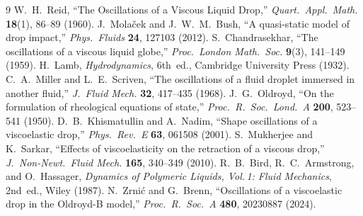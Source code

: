 \documentclass[12pt]{article}
\theoremstyle{definition}
\begin{document}
\bigskip







\begin{thebibliography}{9}
  W.~H.~Reid,
  ``The Oscillations of a Viscous Liquid Drop,''
  \emph{Quart.\ Appl.\ Math.} \textbf{18}(1), 86--89 (1960).
  J.~Mola\v{c}ek and J.~W.~M.~Bush,
  ``A quasi-static model of drop impact,''
  \emph{Phys.\ Fluids} \textbf{24}, 127103 (2012).
  S.~Chandrasekhar,
  ``The oscillations of a viscous liquid globe,''
  \emph{Proc.\ London Math.\ Soc.} \textbf{9}(3), 141--149 (1959).
  H.~Lamb,
  \emph{Hydrodynamics}, 6th~ed., Cambridge University Press (1932).
  C.~A.~Miller and L.~E.~Scriven,
  ``The oscillations of a fluid droplet immersed in another fluid,''
  \emph{J.\ Fluid Mech.} \textbf{32}, 417--435 (1968).
  J.~G.~Oldroyd,
  ``On the formulation of rheological equations of state,''
  \emph{Proc.\ R.\ Soc.\ Lond.\ A} \textbf{200}, 523--541 (1950).
  D.~B.~Khismatullin and A.~Nadim,
  ``Shape oscillations of a viscoelastic drop,''
  \emph{Phys.\ Rev.\ E} \textbf{63}, 061508 (2001).
  S.~Mukherjee and K.~Sarkar,
  ``Effects of viscoelasticity on the retraction of a viscous drop,''
  \emph{J.\ Non-Newt.\ Fluid Mech.} \textbf{165}, 340--349 (2010).
  R.~B.~Bird, R.~C.~Armstrong, and O.~Hassager,
  \emph{Dynamics of Polymeric Liquids, Vol.\,1: Fluid Mechanics},
  2nd~ed., Wiley (1987).
  N.~Zrni\'{c} and G.~Brenn,
  ``Oscillations of a viscoelastic drop in the Oldroyd-B model,''
  \emph{Proc.\ R.\ Soc.\ A} \textbf{480}, 20230887 (2024).
\end{thebibliography}
\end{document}

